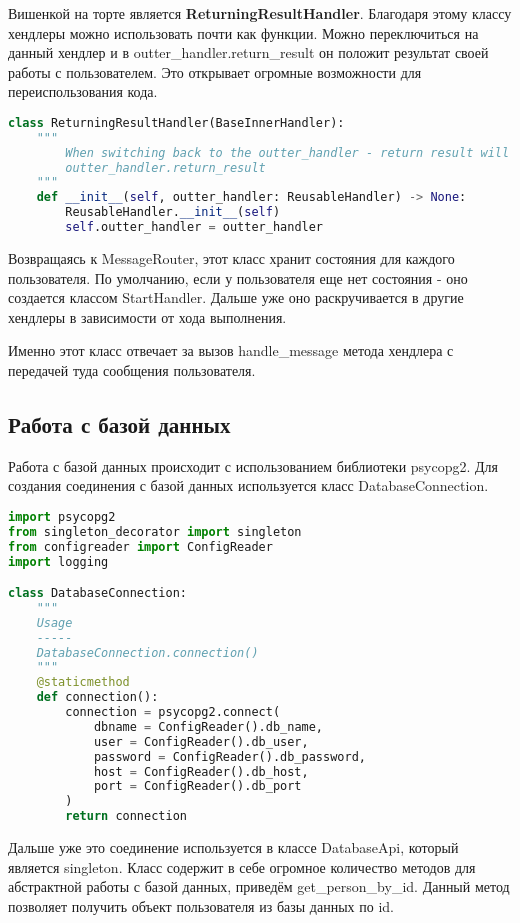 \documentclass[12pt]{extarticle}
\begin{document}
Вишенкой на торте является \textbf{ReturningResultHandler}. Благодаря этому классу хендлеры можно использовать почти как функции. Можно переключиться на данный хендлер и в outter\_handler.return\_result он положит результат своей работы с пользователем. Это открывает огромные возможности для переиспользования кода.

\begin{lstlisting}[language=Python,style=mystyle,caption=class ReturningResultHandler]
class ReturningResultHandler(BaseInnerHandler):
    """
        When switching back to the outter_handler - return result will be in
        outter_handler.return_result
    """
    def __init__(self, outter_handler: ReusableHandler) -> None:
        ReusableHandler.__init__(self)
        self.outter_handler = outter_handler
\end{lstlisting}

Возвращаясь к MessageRouter, этот класс хранит состояния для каждого пользователя. По умолчанию, если у пользователя еще нет состояния - оно создается классом StartHandler. Дальше уже оно раскручивается в другие хендлеры в зависимости от хода выполнения.

Именно этот класс отвечает за вызов handle\_message метода хендлера с передачей туда сообщения пользователя.

\subsection{Работа с базой данных}

Работа с базой данных происходит с использованием библиотеки psycopg2. Для создания соединения с базой данных используется класс DatabaseConnection.

\begin{lstlisting}[language=Python,style=mystyle,caption=class ReturningResultHandler]
import psycopg2
from singleton_decorator import singleton
from configreader import ConfigReader
import logging

class DatabaseConnection:
    """
    Usage
    -----
    DatabaseConnection.connection()
    """
    @staticmethod
    def connection():
        connection = psycopg2.connect(
            dbname = ConfigReader().db_name,
            user = ConfigReader().db_user,
            password = ConfigReader().db_password,
            host = ConfigReader().db_host,
            port = ConfigReader().db_port
        )
        return connection
\end{lstlisting}

Дальше уже это соединение используется в классе DatabaseApi, который является singleton. Класс содержит в себе огромное количество методов для абстрактной работы с базой данных, приведём get\_person\_by\_id. Данный метод позволяет получить объект пользователя из базы данных по id.
\end{document}

